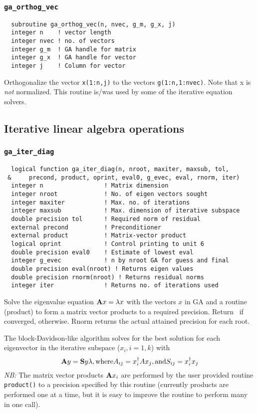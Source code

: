 \subsubsection{{\tt ga\_orthog\_vec}}
\begin{verbatim}
  subroutine ga_orthog_vec(n, nvec, g_m, g_x, j) 
  integer n    ! vector length 
  integer nvec ! no. of vectors 
  integer g_m  ! GA handle for matrix 
  integer g_x  ! GA handle for vector 
  integer j    ! Column for vector
\end{verbatim}
Orthogonalize the vector \verb+x(1:n,j)+ to the vectors
\verb+g(1:n,1:nvec)+.  Note that x is {\em not} normalized.  This routine
is/was used by some of the iterative equation solvers.

\subsection{Iterative linear algebra operations}

\subsubsection{{\tt ga\_iter\_diag}}
\begin{verbatim}
  logical function ga_iter_diag(n, nroot, maxiter, maxsub, tol,
 &     precond, product, oprint, eval0, g_evec, eval, rnorm, iter)
  integer n                 ! Matrix dimension
  integer nroot             ! No. of eigen vectors sought
  integer maxiter           ! Max. no. of iterations
  integer maxsub            ! Max. dimension of iterative subspace
  double precision tol      ! Required norm of residual
  external precond          ! Preconditioner
  external product          ! Matrix-vector product
  logical oprint            ! Control printing to unit 6
  double precision eval0    ! Estimate of lowest eval
  integer g_evec            ! n by nroot GA for guess and final
  double precision eval(nroot) ! Returns eigen values
  double precision rnorm(nroot) ! Returns residual norms
  integer iter              ! Returns no. of iterations used
\end{verbatim}
  Solve the eigenvalue equation ${\bf A}x = \lambda x$ with the
vectors $x$ in GA and a routine (product) to form a matrix vector
products to a required precision.  Return \TRUE\ if converged, \FALSE
otherwise. Rnorm returns the actual attained precision for each root.
     
The block-Davidson-like algorithm solves for the best solution for
each eigenvector in the iterative subspace ($x_i, i = 1, k$) with
\begin{displaymath}
  {\bf A} y = {\bf S}y\lambda, \mbox{where} A_{ij} = x_i^{\dagger} A x_j,
\mbox{and} S_{ij} = x_i^{\dagger} x_j
\end{displaymath}
 {\em NB:} The matrix vector products ${\bf A}x_i$ are performed by the user
provided routine \verb+product()+ to a precision specified by this routine
(currently products are performed one at a time, but it is easy to
improve the routine to perform many in one call).
     
